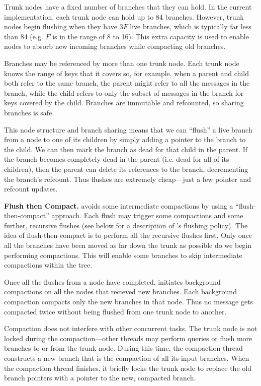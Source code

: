 Trunk nodes have a fixed number of branches that they can hold.  In
the current \sysname implementation, each trunk node can hold up to 84
branches.  However, trunk nodes begin flushing when they have $3F$
live branches, which is typically far less than 84 (e.g. $F$ is in the
range of 8 to 16).  This extra capacity is used to enable nodes to
absorb new incoming branches while compacting old branches.

Branches may be referenced by more than one trunk node.  Each trunk
node knows the range of keys that it covers so, for example, when a
parent and child both refer to the same branch, the parent might refer
to all the messages in the branch, while the child refers to only the
subset of messages in the branch for keys covered by the child.
Branches are immutable and refcounted, so sharing branches is safe.

This node structure and branch sharing means that we can ``flush'' a
live branch from a node to one of its children by simply adding a
pointer to the branch to the child. We can then mark the branch as
dead for that child in the parent.  If the branch becomes completely
dead in the parent (i.e. dead for all of its children), then the
parent can delete its references to the branch, decrementing the
branch's refcount.  Thus flushes are extremely cheap---just a few
pointer and refcount updates.

\textbf{Flush then Compact.}  \sysname avoids some intermediate
compactions by using a ``flush-then-compact'' approach.  Each flush
may trigger some compactions and some further, recursive flushes (see
below for a description of \sysname's flushing policy).  The idea of
flush-then-compact is to perform all the recursive flushes first.
Only once all the branches have been moved as far down the trunk as
possible do we begin performing compactions.  This will enable some
branches to skip intermediate compactions within the tree.

Once all the flushes from a node have completed, \sysname initiates
background compactions on all the nodes that recieved new branches.
Each background compaction compacts only the new branches in that node.
Thus no message gets compacted twice without being flushed from one
trunk node to another.

Compaction does not interfere with other concurrent tasks.  The trunk
node is not locked during the compaction---other threads may perform
queries or flush more branches to or from the trunk node.  During this
time, the compaction thread constructs a new branch that is the
compaction of all its input branches.  When the compaction thread
finishes, it briefly locks the trunk node to replace the old branch
pointers with a pointer to the new, compacted branch.

